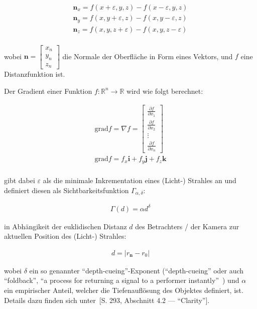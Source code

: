 \begin{gather}
    \bm{n}_{x} = f(x + \varepsilon, y, z) - f(x - \varepsilon, y, z) \\
    \bm{n}_{y} = f(x, y + \varepsilon,  z) - f(x, y - \varepsilon,  z) \\
    \bm{n}_{z} = f(x, y, z + \varepsilon) - f(x, y, z - \varepsilon) \\
\end{gather}

wobei $\bm{n} = \begin{bmatrix} x_{n} \\ y_{n} \\ z_{n} \end{bmatrix}$
die Normale der Oberfläche in Form eines Vektors, und $f$ eine
Distanzfunktion ist.

Der Gradient einer Funktion $f: \mathbb{R}^{n} \to \mathbb{R}$ wird wie
folgt berechnet:

\begin{gather}
    \text{grad} f = \nabla f = \begin{bmatrix}
        \frac{\partial f}{\partial x_{1}} \\
        \frac{\partial f}{\partial x_{2}} \\
        \vdots \\
        \frac{\partial f}{\partial x_{n}} 
    \end{bmatrix}\\
    \text{grad} f = f_{x}\bm{i} + f_{y}\bm{j} + f_{z}\bm{k}\\
\end{gather}

\cite{hart_ray_1989} gibt dabei $\varepsilon$ als die minimale
Inkrementation eines (Licht-) Strahles an und definiert diesen als
Sichtbarkeitsfunktion $\Gamma_{\alpha, \delta}$:

\begin{gather}
    \Gamma(d) = \alpha d^{\delta}
\end{gather}

in Abhängikeit der euklidischen Distanz
$d$ des Betrachters / der Kamera zur aktuellen Position des (Licht-)
Strahles:

\begin{gather}
    d = |r_{\bm{n}} - r_{0}|
\end{gather}

wobei $\delta$ ein so genannter ``depth-cueing''-Exponent
(``depth-cueing'' oder auch ``foldback'', ``a process for returning a
signal to a performer
instantly''~\cite{liam_collins_sons_&_co._ltd._collins_2015}) und
$\alpha$ ein empirischer Anteil, welcher die Tiefenauflösung des
Objektes definiert,
ist.
Details dazu finden sich unter~\cite{hart_ray_1989}[S. 293, Abschnitt
4.2 --- ``Clarity''].

